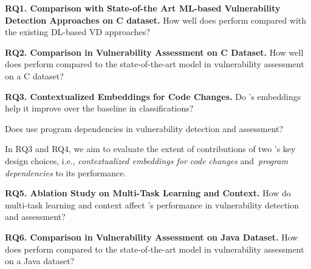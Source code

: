 

\vspace{1pt}
\noindent\textbf{RQ1. Comparison with State-of-the Art ML-based Vulnerability
Detection Approaches on C dataset.} How well does {\tool} perform
compared with the existing DL-based VD approaches?

\vspace{1pt}
\noindent\textbf{RQ2. Comparison in Vulnerability Assessment on C
  Dataset.} How well does {\tool} perform compared to the
state-of-the-art model in vulnerability assessment on a C dataset?


\noindent\textbf{RQ3. Contextualized Embeddings for Code Changes.} Do {\tool}'s embeddings help it improve over the
baseline in classifications?


 Does {\tool} use program dependencies in vulnerability detection and assessment?

In RQ3 and RQ4, we aim to evaluate the extent of contributions of two
  {\tool}'s key design choices, i.e., {\em contextualized embeddings
  for code changes} and~{\em program dependencies} to its performance.


\noindent\textbf{RQ5. Ablation Study on Multi-Task Learning and Context.} How do multi-task
learning and context affect {\tool}'s performance in vulnerability
detection and assessment?

\vspace{1pt}
\noindent\textbf{RQ6. Comparison in Vulnerability Assessment on Java
  Dataset.} How does {\tool} perform compared to the
state-of-the-art model in vulnerability assessment on a Java dataset?


